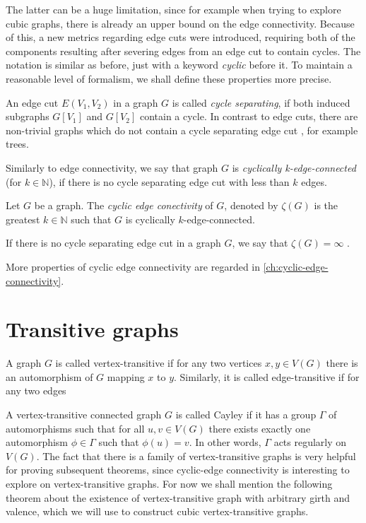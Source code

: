 \documentclass[12pt, twoside]{book}
\begin{document}
The latter can be a huge limitation, since for example when trying to explore cubic graphs, there is already an upper bound on the edge connectivity. Because of this, a new metrics regarding edge cuts were introduced, requiring both of the components resulting after severing edges from an edge cut to contain cycles. The notation is similar as before, just with a keyword \textit{cyclic} before it. To maintain a reasonable level of formalism, we shall define these properties more precise.

An edge cut $E(V_1,V_2)$ in a graph $G$ is called \textit{cycle separating}, if both induced subgraphs $G[V_1]$ and $G[V_2]$ contain a cycle. In contrast to edge cuts, there are non-trivial graphs which do not contain a cycle separating edge cut \cite{atoms-of-cyclic, Lou2008, lovasz1965graphs}, for example trees. 

Similarly to edge connectivity, we say that graph $G$ is \textit{cyclically k-edge-connected} (for $k\in\mathbb{N}$), if there is no cycle separating edge cut with less than $k$ edges.

\begin{definition}
	Let $G$ be a graph. The \textit{cyclic edge conectivity} of $G$, denoted by $\zeta(G)$ is the greatest $k\in\mathbb{N}$ such that $G$ is cyclically $k$-edge-connected.
\end{definition}

If there is no cycle separating edge cut in a graph $G$, we say that $\zeta(G)=\infty$ \cite{Lou2008}.


More properties of cyclic edge connectivity are regarded in \cref{ch:cyclic-edge-connectivity}.

\section{Transitive graphs}\label{sec:transitive-graphs}

A graph $G$ is called vertex-transitive if for any two vertices $x,y\in V(G)$ there is an automorphism of $G$ mapping $x$ to $y$. Similarly, it is called edge-transitive if for any two edges 

A vertex-transitive connected graph $G$ is called Cayley if it has a group $\Gamma$ of automorphisms such that for all $u, v \in V(G)$ there exists exactly one automorphism $\phi\in\Gamma$ such that $\phi(u)=v$. In other words, $\Gamma$ acts regularly on $V(G)$. The fact that there is a family of vertex-transitive graphs is very helpful for proving subsequent theorems, since cyclic-edge connectivity is interesting to explore on vertex-transitive graphs. For now we shall mention the following theorem about the existence of vertex-transitive graph with arbitrary girth and valence, which we will use to construct cubic vertex-transitive graphs.
\end{document}
